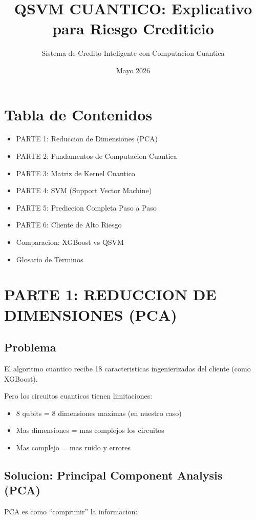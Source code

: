 \documentclass[11pt]{article}
\title{\textbf{QSVM CUANTICO: Explicativo para Riesgo Crediticio}}
\author{Sistema de Credito Inteligente con Computacion Cuantica}
\date{Mayo 2026}
\begin{document}
\maketitle

\section*{Tabla de Contenidos}
\begin{itemize}
\item PARTE 1: Reduccion de Dimensiones (PCA)
\item PARTE 2: Fundamentos de Computacion Cuantica
\item PARTE 3: Matriz de Kernel Cuantico
\item PARTE 4: SVM (Support Vector Machine)
\item PARTE 5: Prediccion Completa Paso a Paso
\item PARTE 6: Cliente de Alto Riesgo
\item Comparacion: XGBoost vs QSVM
\item Glosario de Terminos
\end{itemize}

\section*{PARTE 1: REDUCCION DE DIMENSIONES (PCA)}

\subsection*{Problema}

El algoritmo cuantico recibe 18 caracteristicas ingenierizadas del cliente (como XGBoost).

Pero los circuitos cuanticos tienen limitaciones:
\begin{itemize}
\item 8 qubits = 8 dimensiones maximas (en nuestro caso)
\item Mas dimensiones = mas complejos los circuitos
\item Mas complejo = mas ruido y errores
\end{itemize}

\subsection*{Solucion: Principal Component Analysis (PCA)}

PCA es como ``comprimir'' la informacion:
\end{document}
